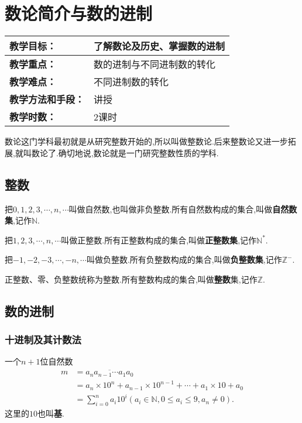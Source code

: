 \section{数论简介与数的进制}

\begin{table}[htb]
	\centering  
	\begin{tabular}{p{32mm}|p{95.6mm}}
		\hline 
		\textbf{教学目标：}       & 了解数论及历史、掌握数的进制  \\ \hline
		\textbf{教学重点：}       & 数的进制与不同进制数的转化 \\ \hline
		\textbf{教学难点：}       & 不同进制数的转化 \\ \hline
		\textbf{教学方法和手段：} & 讲授  \\ \hline
		\textbf{教学时数：}       & 2课时 \\ \hline
	\end{tabular}
\end{table}

\entry 数论这门学科最初就是从研究整数开始的,所以叫做整数论.后来整数论又进一步拓展,就叫数论了.确切地说,数论就是一门研究整数性质的学科.

\subsection{整数}
\entry 把$0,1,2,3,\cdots,n,\cdots$叫做自然数,也叫做非负整数.所有自然数构成的集合,叫做\textbf{自然数集},记作$\mathbb{N}$.

\entry 把$1,2,3,\cdots,n,\cdots$叫做正整数.所有正整数构成的集合,叫做\textbf{正整数集},记作$\mathbb{N}^{*}$.

\entry 把$-1,-2,-3,\cdots,-n,\cdots$叫做负整数.所有负整数构成的集合,叫做\textbf{负整数集},记作$\mathbb{Z}^{-}$.

\entry 正整数、零、负整数统称为整数.所有整数构成的集合,叫做\textbf{整数}集,记作$\mathbb{Z}$.

\subsection{数的进制}
\subsubsection{十进制及其计数法}
\entry 一个$n+1$位自然数
\begin{equation*}
	\begin{split}
		m&=\overline{a_{n}a_{n-1}\cdots a_{1}a_{0}}\\
		   &=a_{n}\times10^{n}+a_{n-1}\times10^{n-1}+\cdots+a_{1}\times10+a_{0}\\
		   &=\sum_{i=0}^{n}a_{i}10^{i}(a_{i}\in\mathbb{N},0\leqslant a_{i}\leqslant9,a_{n}\neq0).
	\end{split}
\end{equation*}
这里的$10$也叫\textbf{基}.

